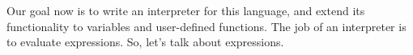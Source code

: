 Our goal now is to write an interpreter for this language, and extend its
functionality to variables and user-defined functions. The job of an interpreter
is to evaluate expressions. So, let's talk about expressions.
